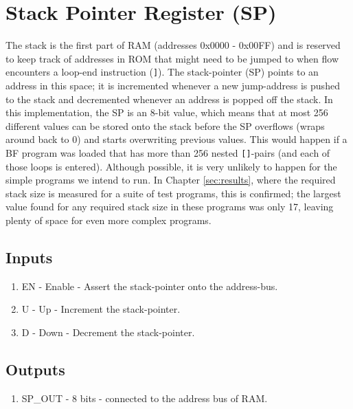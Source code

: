 \section{Stack Pointer Register (SP)} \label{sec:architecture:sp}
The stack is the first part of RAM (addresses 0x0000 - 0x00FF) and is reserved to keep track of addresses in ROM that might need to be jumped to when flow encounters a loop-end instruction (\texttt{]}). The stack-pointer (SP) points to an address in this space; it is incremented whenever a new jump-address is pushed to the stack and decremented whenever an address is popped off the stack. In this implementation, the SP is an 8-bit value, which means that at most 256 different values can be stored onto the stack before the SP overflows (wraps around back to 0) and starts overwriting previous values. This would happen if a BF program was loaded that has more than 256 nested \texttt{[]}-pairs (and each of those loops is entered). Although possible, it is very unlikely to happen for the simple programs we intend to run. In Chapter \ref{sec:results}, where the required stack size is measured for a suite of test programs, this is confirmed; the largest value found for any required stack size in these programs was only 17, leaving plenty of space for even more complex programs.
  
\subsection*{Inputs}
\begin{enumerate}
\itemsep0em 
\item EN - Enable - Assert the stack-pointer onto the address-bus.
\item U - Up - Increment the stack-pointer.
\item D - Down - Decrement the stack-pointer.
\end{enumerate}

\subsection*{Outputs}
\begin{enumerate}
\itemsep0em 
\item SP\_OUT - 8 bits - connected to the address bus of RAM.
\end{enumerate}


